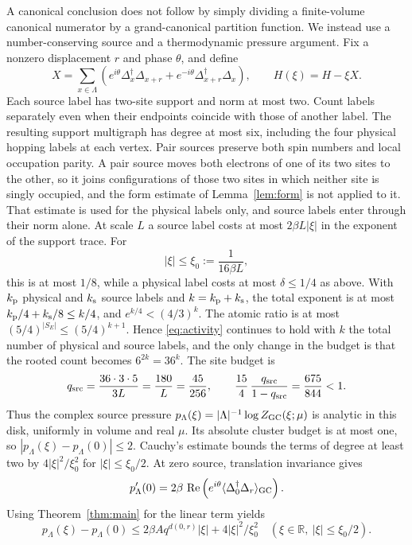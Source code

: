 \documentclass[11pt]{article}
\newcommand{\Deltaop}{\Delta}
\begin{document}
A canonical conclusion does not follow by simply dividing a finite-volume canonical numerator by a grand-canonical partition function. We instead use a number-conserving source and a thermodynamic pressure argument. Fix a nonzero displacement $r$ and phase $\theta$, and define
\begin{equation}\label{eq:source}
 X=\sum_{x\in\Lambda}\left(e^{i\theta}\Deltaop_x^\dagger\Deltaop_{x+r}
 +e^{-i\theta}\Deltaop_{x+r}^\dagger\Deltaop_x\right),\qquad
 H(\xi)=H-\xi X.
\end{equation}
Each source label has two-site support and norm at most two. Count labels separately even when their endpoints coincide with those of another label. The resulting support multigraph has degree at most six, including the four physical hopping labels at each vertex. Pair sources preserve both spin numbers and local occupation parity. A pair source moves both electrons of one of its two sites to the other, so it joins configurations of those two sites in which neither site is singly occupied, and the form estimate of Lemma~\ref{lem:form} is not applied to it. That estimate is used for the physical labels only, and source labels enter through their norm alone. At scale $L$ a source label costs at most $2\beta L|\xi|$ in the exponent of the support trace. For
\[
 |\xi|\le\xi_0:=\frac{1}{16\beta L},
\]
this is at most $1/8$, while a physical label costs at most $\delta\le1/4$ as above. With $k_{\rm p}$ physical and $k_{\rm s}$ source labels and $k=k_{\rm p}+k_{\rm s}$, the total exponent is at most $k_{\rm p}/4+k_{\rm s}/8\le k/4$, and $e^{k/4}<(4/3)^k$. The atomic ratio is at most $(5/4)^{|S_E|}\le(5/4)^{k+1}$. Hence \eqref{eq:activity} continues to hold with $k$ the total number of physical and source labels, and the only change in the budget is that the rooted count becomes $6^{2k}=36^k$. The site budget is
\[
 q_{\rm src}=\frac{36\cdot3\cdot5}{3L}=\frac{180}{L}=\frac{45}{256},\qquad
 \frac{15}{4}\,\frac{q_{\rm src}}{1-q_{\rm src}}=\frac{675}{844}<1.
\]
Thus the complex source pressure $p_\Lambda(\xi)=|\Lambda|^{-1}\log Z_{\rm GC}(\xi;\mu)$ is analytic in this disk, uniformly in volume and real $\mu$. Its absolute cluster budget is at most one, so $|p_\Lambda(\xi)-p_\Lambda(0)|\le2$. Cauchy's estimate bounds the terms of degree at least two by $4|\xi|^2/\xi_0^2$ for $|\xi|\le\xi_0/2$. At zero source, translation invariance gives
\[
 p_\Lambda'(0)=2\beta\,\operatorname{Re}\left(e^{i\theta}
 \langle\Deltaop_0^\dagger\Deltaop_r\rangle_{\rm GC}\right).
\]
Using Theorem~\ref{thm:main} for the linear term yields
\begin{equation}\label{eq:sourcebound}
 p_\Lambda(\xi)-p_\Lambda(0)
 \le 2\beta A q^{d(0,r)}|\xi|+4|\xi|^2/\xi_0^2
 \quad (\xi\in\mathbb R,\ |\xi|\le\xi_0/2).
\end{equation}
\end{document}
